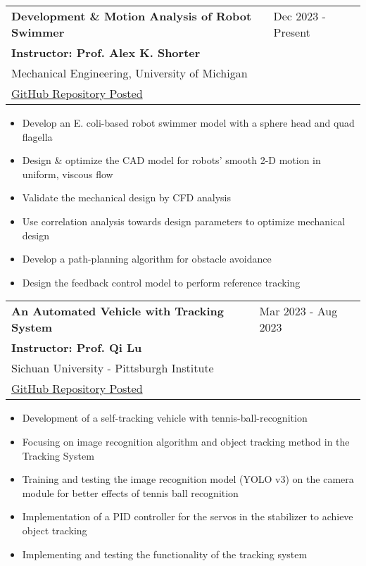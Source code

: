 \documentclass[letter,12pt]{article}
\begin{document}
\begin{tabularx}{\linewidth}{@{}l X@{}}
\large \textbf{Development \& Motion Analysis of Robot Swimmer} & \hfill Dec 2023 - Present \\
\small{\textbf{Instructor: Prof. Alex K. Shorter}} & \hfill {} \\
\small{Mechanical Engineering, University of Michigan} & \hfill {} \\
\small{\href{https://github.com/Robin0265/PathPlanning_Code}{GitHub Repository Posted}} & \hfill {} \\
\end{tabularx}

\begin{itemize}[
    rightmargin=2cm
]
    \setlength{\itemsep}{1pt}
    \setlength{\parskip}{0pt}
    \setlength{\parsep}{0pt}
    \item{\small Develop an E. coli-based robot swimmer model with a sphere head and quad flagella}
    \item{\small Design \& optimize the CAD model for robots’ smooth 2-D motion in uniform, viscous flow}
    \item{\small Validate the mechanical design by CFD analysis}
    \item{\small Use correlation analysis towards design parameters to optimize mechanical design}
    \item{\small Develop a path-planning algorithm for obstacle avoidance}
    \item{\small Design the feedback control model to perform reference tracking}
    
\end{itemize}

\begin{tabularx}{\linewidth}{@{}l X@{}}
\large \textbf{An Automated Vehicle with Tracking System} & \hfill Mar 2023 - Aug 2023 \\
\small \textbf{Instructor: Prof. Qi Lu} & \hfill {} \\
\small{{Sichuan University - Pittsburgh Institute}} & \hfill {} \\
\small{\href{https://github.com/Robin0265/StablerCTRL}{GitHub Repository Posted}} & \hfill {} \\
\end{tabularx}

\begin{itemize}[
    rightmargin=2cm
]
    \setlength{\itemsep}{1pt}
    \setlength{\parskip}{0pt}
    \setlength{\parsep}{0pt}
    \item{\small Development of a self-tracking vehicle with tennis-ball-recognition}
    \item{\small Focusing on image recognition algorithm and object tracking method in the Tracking System}
    \item{\small Training and testing the image recognition model (YOLO v3) on the camera module for better effects of tennis ball recognition}
    \item{\small Implementation of a PID controller for the servos in the stabilizer to achieve object tracking}
    \item{\small Implementing and testing the functionality of the tracking system}
\end{itemize}
\end{document}
